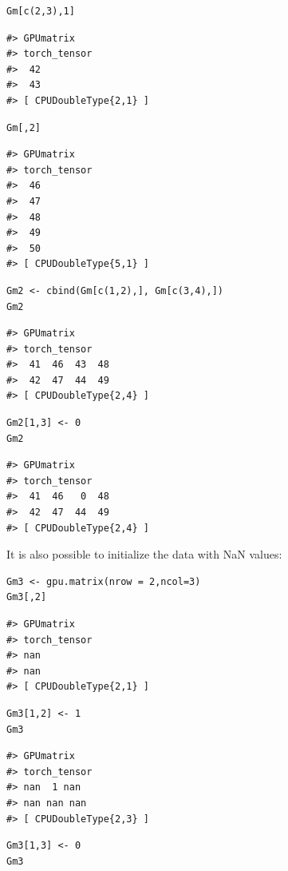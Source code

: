 \begin{verbatim}
Gm[c(2,3),1]
\end{verbatim}

\begin{verbatim}
#> GPUmatrix
#> torch_tensor
#>  42
#>  43
#> [ CPUDoubleType{2,1} ]
\end{verbatim}

\begin{verbatim}
Gm[,2]
\end{verbatim}

\begin{verbatim}
#> GPUmatrix
#> torch_tensor
#>  46
#>  47
#>  48
#>  49
#>  50
#> [ CPUDoubleType{5,1} ]
\end{verbatim}

\begin{verbatim}
Gm2 <- cbind(Gm[c(1,2),], Gm[c(3,4),])
Gm2
\end{verbatim}

\begin{verbatim}
#> GPUmatrix
#> torch_tensor
#>  41  46  43  48
#>  42  47  44  49
#> [ CPUDoubleType{2,4} ]
\end{verbatim}

\begin{verbatim}
Gm2[1,3] <- 0
Gm2
\end{verbatim}

\begin{verbatim}
#> GPUmatrix
#> torch_tensor
#>  41  46   0  48
#>  42  47  44  49
#> [ CPUDoubleType{2,4} ]
\end{verbatim}

It is also possible to initialize the data with NaN values:

\begin{verbatim}
Gm3 <- gpu.matrix(nrow = 2,ncol=3)
Gm3[,2]
\end{verbatim}

\begin{verbatim}
#> GPUmatrix
#> torch_tensor
#> nan
#> nan
#> [ CPUDoubleType{2,1} ]
\end{verbatim}

\begin{verbatim}
Gm3[1,2] <- 1 
Gm3
\end{verbatim}

\begin{verbatim}
#> GPUmatrix
#> torch_tensor
#> nan  1 nan
#> nan nan nan
#> [ CPUDoubleType{2,3} ]
\end{verbatim}

\begin{verbatim}
Gm3[1,3] <- 0
Gm3
\end{verbatim}

